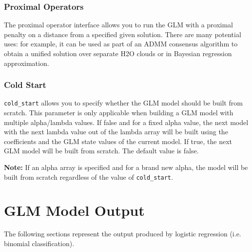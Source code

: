 \subsubsection{Proximal Operators}

The proximal operator interface allows you to run the GLM with a proximal penalty on a distance from a specified
given solution. There are many potential uses: for example, it can be used as part of an ADMM consensus algorithm
to obtain a unified solution over separate H2O clouds or in Bayesian regression approximation.

\subsubsection{Cold Start}
\texttt{cold\_start} allows you to specify whether the GLM model should be built from scratch. This parameter is only applicable when building a GLM model with multiple alpha/lambda values. If false and for a fixed alpha value, the next model with the next lambda value out of the lambda array will be built using the coefficients and the GLM state values of the current model. If true, the next GLM model will be built from scratch. The default value is false.

\textbf{Note:} If an alpha array is specified and for a brand new alpha, the model will be built from scratch regardless of the value of \texttt{cold\_start}.



\section{GLM Model Output}

The following sections represent the output produced by logistic regression (i.e. binomial classification).

\waterExampleInR


\newpage
\waterExampleInPython


